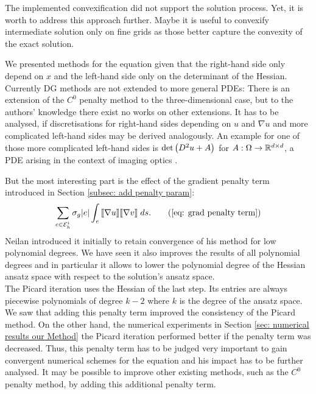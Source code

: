 The implemented convexification did not support the solution process. Yet, it is worth to address this approach further. Maybe it is useful to convexify intermediate solution only on fine grids as those better capture the convexity of the exact solution.

We presented methods for the \MA equation given that the right-hand side only depend on $x$ and the left-hand side only on the determinant of the Hessian. Currently DG methods are not extended to more general PDEs: There is an extension of the $C^0$ penalty method to the three-dimensional case\cite{BN2012}, but to the authors' knowledge there exist no works on other extensions. It has to be analysed, if  discretisations for right-hand sides depending on $u$ and $\nabla u$ and more complicated left-hand sides may be derived analogously. An example for one of those more complicated left-hand sides is $\det{\left(D^2 u +A\right)}$ for $A:\Omega \rightarrow \mathbb{R}^{d \times d}$, a PDE arising in the context of imaging optics \cite{BHP2014}.
 
But the most interesting part is the effect of the gradient penalty term introduced in Section \ref{subsec: add penalty param}:
\begin{align}
	\sum_{e \in \edgesi} \sigma_g |e |\myIntS e {\jump{ \nabla u} \jump {\nabla v}}. \tag{\ref{eq: grad penalty term}}
\end{align}
Neilan introduced it initially to retain convergence of his method for low polynomial degrees. We have seen it also improves the results of all polynomial degrees and in particular it allows to lower the polynomial degree of the Hessian ansatz space with respect to the solution's ansatz space. \\
The Picard iteration uses the Hessian of the last step. Its entries are always piecewise polynomials of degree $k-2$ where $k$ is the degree of the ansatz space. We saw that adding this penalty term improved the consistency of the Picard method. On the other hand, the numerical experiments in Section \ref{sec: numerical results our Method} the Picard iteration performed better if the penalty term was decreased. Thus, this penalty term has to be judged very important to gain convergent numerical schemes for the \MA equation and his impact has to be further analysed. It may be possible to improve other existing methods, such as the $C^0$ penalty method, by adding this additional penalty term. 
